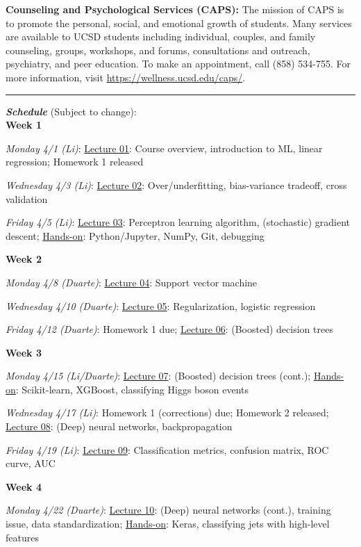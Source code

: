 \documentclass[12pt]{article}
\begin{document}
\noindent\textbf{Counseling and Psychological Services (CAPS):} The mission of CAPS is to promote the personal, social, and emotional growth of students.
Many services are available to UCSD students including individual, couples, and family counseling, groups, workshops, and forums, consultations and outreach, psychiatry, and peer education.
To make an appointment, call (858) 534-755.
For more information, visit \href{https://wellness.ucsd.edu/caps/}{https://wellness.ucsd.edu/caps/}.

\begin{center}
	\rule{\textwidth}{0.5pt}
\end{center}

\noindent\textbf{\emph{Schedule}} (Subject to change):\\

\noindent\textbf{Week 1}

\emph{Monday 4/1 (Li)}: \underline{Lecture 01}: Course overview, introduction to ML, linear regression; Homework 1 released

\emph{Wednesday 4/3 (Li)}: \underline{Lecture 02}: Over/underfitting, bias-variance tradeoff, cross validation

\emph{Friday 4/5 (Li)}: \underline{Lecture 03}: Perceptron learning algorithm, (stochastic) gradient descent; \underline{Hands-on}: Python/Jupyter, NumPy, Git, debugging

\noindent\textbf{Week 2}

\emph{Monday 4/8 (Duarte)}: \underline{Lecture 04}: Support vector machine

\emph{Wednesday 4/10 (Duarte)}: \underline{Lecture 05}: Regularization, logistic regression

\emph{Friday 4/12 (Duarte)}: Homework 1 due; \underline{Lecture 06}: (Boosted) decision trees

\noindent\textbf{Week 3}

\emph{Monday 4/15 (Li/Duarte)}: \underline{Lecture 07}: (Boosted) decision trees (cont.); \underline{Hands-on}: Scikit-learn, XGBoost, classifying Higgs boson events

\emph{Wednesday 4/17 (Li)}: Homework 1 (corrections) due; Homework 2 released; \underline{Lecture 08}: (Deep) neural networks, backpropagation

\emph{Friday 4/19 (Li)}: \underline{Lecture 09}: Classification metrics, confusion matrix, ROC curve, AUC

\noindent\textbf{Week 4}

\emph{Monday 4/22 (Duarte)}: \underline{Lecture 10}: (Deep) neural networks (cont.), training issue, data standardization; \underline{Hands-on}: Keras, classifying jets with high-level features
\end{document}
